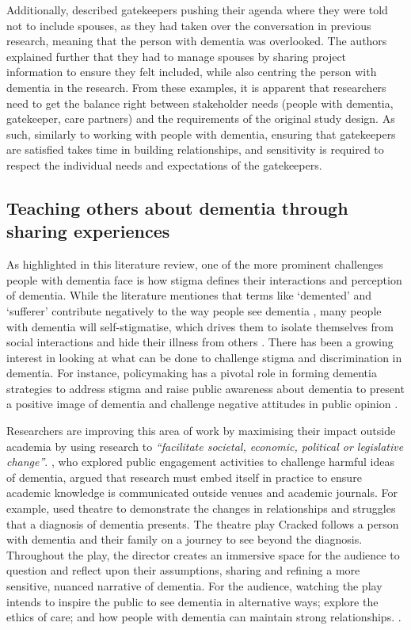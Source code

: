 Additionally, \cite{thoft2021journey} described gatekeepers pushing their agenda where they were told not to include spouses, as they had taken over the conversation in previous research, meaning that the person with dementia was overlooked. The authors explained further that they had to manage spouses by sharing project information to ensure they felt included, while also centring the person with dementia in the research. From these examples, it is apparent that researchers need to get the balance right between stakeholder needs (people with dementia, gatekeeper, care partners) and the requirements of the original study design. As such, similarly to working with people with dementia, ensuring that gatekeepers are satisfied takes time in building relationships, and sensitivity is required to respect the individual needs and expectations of the gatekeepers.

\subsection{Teaching others about dementia through sharing experiences}
\label{BL:PublicPerception}
As highlighted in this literature review, one of the more prominent challenges people with dementia face is how stigma defines their interactions and perception of dementia. While the literature mentiones that terms like `demented' and `sufferer' contribute negatively to the way people see dementia \citep{peel2014living}, many people with dementia will self-stigmatise, which drives them to isolate themselves from social interactions and hide their illness from others \citep{milne2010d}. There has been a growing interest in looking at what can be done to challenge stigma and discrimination in dementia. For instance, policymaking has a pivotal role in forming dementia strategies to address stigma and raise public awareness about dementia to present a positive image of dementia and challenge negative attitudes in public opinion \citep{kontos_raising_2018,herrmann_systematic_2018}. 

Researchers are improving this area of work by maximising their impact outside academia by using research to \textit{``facilitate societal, economic, political or legislative change''}. \cite{tischler2020using}, who explored public engagement activities to challenge harmful ideas of dementia, argued that research must embed itself in practice to ensure academic knowledge is communicated outside venues and academic journals. For example, \cite{kontos_raising_2018} used theatre to demonstrate the changes in relationships and struggles that a diagnosis of dementia presents. The theatre play Cracked follows a person with dementia and their family on a journey to see beyond the diagnosis. Throughout the play, the director creates an immersive space for the audience to question and reflect upon their assumptions, sharing and refining a more sensitive, nuanced narrative of dementia. For the audience, watching the play intends to inspire the public to see dementia in alternative ways; explore the ethics of care; and how people with dementia can maintain strong relationships.  \citep{gray2020knowledge}.

